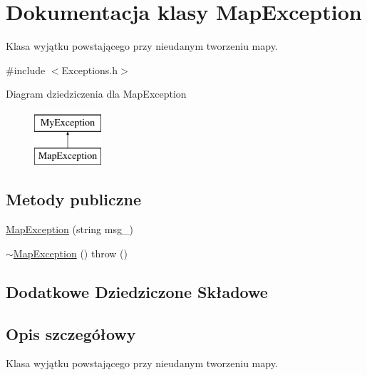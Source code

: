 \hypertarget{class_map_exception}{\section{Dokumentacja klasy Map\-Exception}
\label{class_map_exception}
}


Klasa wyjątku powstającego przy nieudanym tworzeniu mapy.  




{\ttfamily \#include $<$Exceptions.\-h$>$}

Diagram dziedziczenia dla Map\-Exception\begin{figure}[H]
\begin{center}
\leavevmode
\includegraphics[height=2.000000cm]{class_map_exception}
\end{center}
\end{figure}
\subsection*{Metody publiczne}
\begin{DoxyCompactItemize}
\item 
\hyperlink{class_map_exception_a590408e1fea74604dbc156ba566a2436}{Map\-Exception} (string msg\-\_\-)
\item 
\hyperlink{class_map_exception_a98453a6aeae35b783a5f6a4ca1f6e842}{$\sim$\-Map\-Exception} ()  throw ()
\end{DoxyCompactItemize}
\subsection*{Dodatkowe Dziedziczone Składowe}


\subsection{Opis szczegółowy}
Klasa wyjątku powstającego przy nieudanym tworzeniu mapy. 

